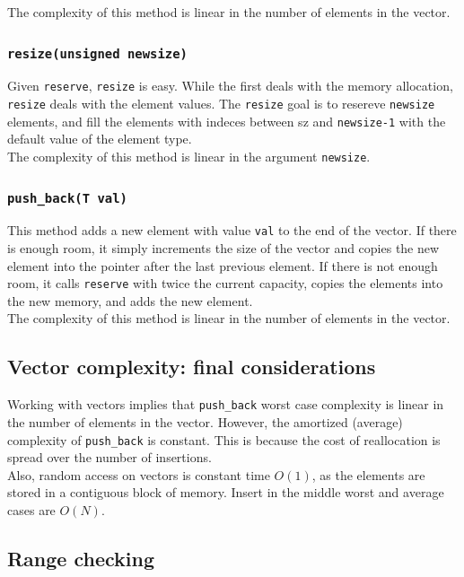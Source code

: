 The complexity of this method is linear in the number of elements in the vector.

\subsubsection{\texttt{resize(unsigned newsize)}}

Given \texttt{reserve}, \texttt{resize} is easy. While the first deals with the memory allocation,
\texttt{resize} deals with the element values. The \texttt{resize} goal is to resereve 
\texttt{newsize} elements, and fill the elements with indeces between sz and \texttt{newsize-1}
with the default value of the element type.\\

The complexity of this method is linear in the argument \texttt{newsize}.

\subsubsection{\texttt{push\_back(T val)}}

This method adds a new element with value \texttt{val} to the end of the vector. If there is 
enough room, it simply increments the size of the vector and copies the new element into the
pointer after the last previous element. If there is not enough room, it calls \texttt{reserve} 
with twice the current capacity, copies the elements into the new memory, and adds the new element.\\

The complexity of this method is linear in the number of elements in the vector.

\subsection{Vector complexity: final considerations}

Working with vectors implies that \texttt{push\_back} worst case complexity is linear in the 
number of elements in the vector. However, the amortized (average) complexity of 
\texttt{push\_back} is constant. This is because the cost of reallocation is spread over the
number of insertions.\\

Also, random access on vectors is constant time $O(1)$, as the elements are stored in a 
contiguous block of memory. Insert in the middle worst and average cases are $O(N)$.

\subsection{Range checking}

